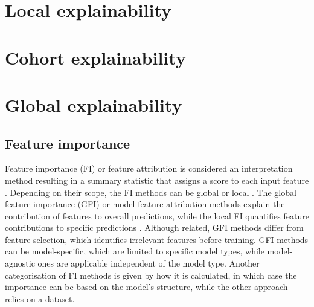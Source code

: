 




\section{Local explainability}
\label{sec:local_explainability}


\section{Cohort explainability}
\label{sec:cohort_explainability}


\section{Global explainability}
\label{sec:global_explainability}

\subsection{Feature importance} \label{subsec:feature-importance-in-tree-ensemble-models}
Feature importance (FI) or feature attribution is considered an interpretation method resulting in a summary statistic that assigns a score to each input feature \cite{molnar2022}.
Depending on their scope, the FI methods can be global or local \cite{Guidotti2018,molnar2022}.
The global feature importance (GFI) or model feature attribution methods explain the contribution of features to overall predictions, while the local FI quantifies feature contributions to specific predictions \cite{molnar2022}.
Although related, GFI methods differ from feature selection, which identifies irrelevant features before training.
GFI methods can be model-specific, which are limited to specific model types, while model-agnostic ones are applicable independent of the model type\cite{molnar2022}.
Another categorisation of FI methods is given by how it is calculated, in which case the importance can be based on the model's structure, while the other approach relies on a dataset.

